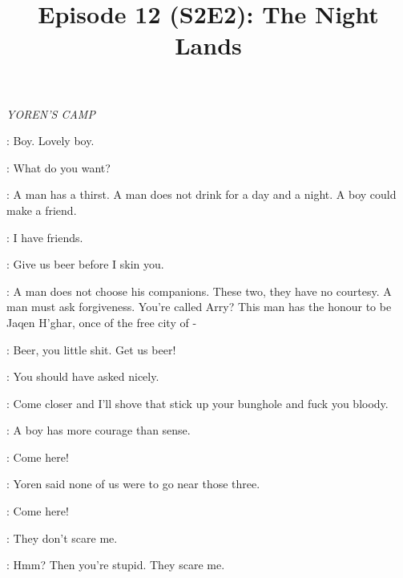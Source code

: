 

\title{Episode 12 (S2E2): The Night Lands}
\author{}
\date{}
\maketitle



\scene

\textit{YOREN'S CAMP}


\JAQEN: Boy. Lovely boy.

\ARYA: What do you want?

\JAQEN: A man has a thirst. A man does not drink for a day and a night. A boy could make a friend.

\ARYA: I have friends.

\RORGE: Give us beer before I skin you.

\JAQEN: A man does not choose his companions. These two, they have no courtesy. A man must ask forgiveness.  You're called Arry? This man has the honour to be Jaqen H'ghar, once of the free city of -

\RORGE: Beer, you little shit. Get us beer!

\ARYA: You should have asked nicely.


\RORGE: Come closer and I'll shove that stick up your bunghole and fuck you bloody.

\JAQEN: A boy has more courage than sense.

\RORGE: Come here!


\GENDRY: Yoren said none of us were to go near those three.

\RORGE: Come here!

\ARYA: They don't scare me.

\GENDRY: Hmm? Then you're stupid. They scare me.

